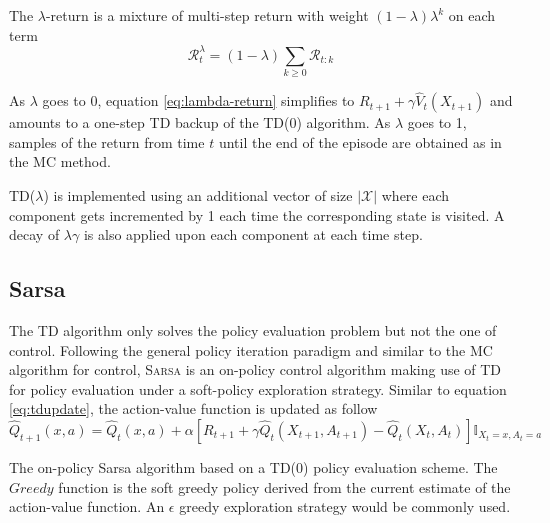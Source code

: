 The $\lambda$-return is a mixture of multi-step return with weight $(1 -
\lambda)\lambda^k$ on each term
\begin{equation}
\mathcal{R}_t^\lambda = (1 - \lambda)\sum_{k \geq 0} \mathcal{R}_{t:k}
\label{eq:lambda-return}
\end{equation}

As $\lambda$ goes to 0, equation \ref{eq:lambda-return}  simplifies to $R_{t+1} +
\gamma \hat{V}_t (X_{t+1})$ and amounts to a one-step TD backup of the TD(0)
algorithm. As $\lambda$ goes to 1, samples of the return from time $t$ until the end of the episode are obtained as in the MC method.

TD($\lambda$) is implemented using an additional vector of size $\left\vert
\mathcal{X} \right\vert$ where each component gets incremented by 1 each time the
corresponding state is visited. A decay of $\lambda \gamma$ is also applied upon
each component at each time step. 

\subsection{Sarsa}
The TD algorithm only solves the policy evaluation problem but not the one of control. Following the general policy iteration paradigm and similar to 
the MC algorithm for control, \textsc{Sarsa} is an on-policy control algorithm making use of
TD for policy evaluation under a soft-policy exploration strategy. Similar to equation
\ref{eq:tdupdate}, the action-value function is updated as follow
\begin{equation}
\hat{Q}_{t+1}(x, a) = \hat{Q}_{t}(x, a) + \alpha \left[ R_{t+1} + \gamma \hat{Q}_t
(X_{t+1}, A_{t+1}) - \hat{Q}_t(X_t, A_t)\right] \mathbb{I}_{X_t = x, A_t = a}
\label{eq:sarsaupdate}
\end{equation}

\begin{algorithm}
\DontPrintSemicolon
{}
\caption{The on-policy Sarsa algorithm based on a TD(0) policy evaluation scheme.
The $Greedy$ function is the soft greedy policy derived from the current estimate of
the action-value function. An $\epsilon$ greedy exploration strategy would be
commonly used.}
\label{alg:sarsa}
\end{algorithm}

